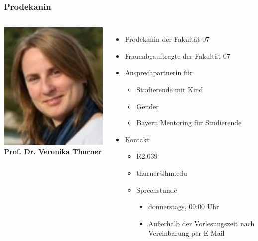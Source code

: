 \documentclass{beamer}
\begin{document}
    \begin{frame} %
    	\frametitle{Prodekanin}
    	\begin{columns}
    		\includegraphics[width=1.0\textwidth]{Prof_Thurner.jpg}
    		\textbf{Prof. Dr. Veronika Thurner}
    		\begin{itemize}
    			\item Prodekanin der Fakultät 07
    			\item Frauenbeauftragte der Fakultät 07
    			\item Ansprechpartnerin für
    			\begin{itemize}
    				\item Studierende mit Kind
    				\item Gender
    				\item Bayern Mentoring für Studierende
    			\end{itemize}
    			\bigskip
    			\item Kontakt
    			\begin{itemize}
    				\item R2.039
    				\item thurner@hm.edu
    				\item Sprechstunde
    				\begin{itemize}
    					\item donnerstags, 09:00 Uhr
    					\item Außerhalb der Vorlesungszeit nach Vereinbarung per E-Mail
    				\end{itemize}
    			\end{itemize}
    		\end{itemize}
    	\end{columns}
    \end{frame}
    
\end{document}

